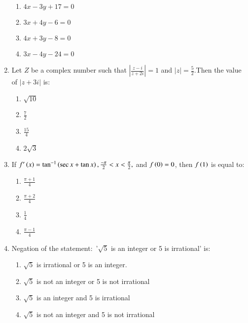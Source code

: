 \documentclass[journal,12pt,twocolumn]{IEEEtran}
\theoremstyle{remark}
\begin{document}
\begin{enumerate}
\begin{enumerate}
    \item $4x-3y+17=0$
    \item $3x+4y-6=0$
    \item $4x+3y-8=0$
    \item $3x-4y-24=0$
\end{enumerate}
\item Let $Z$ be a complex number such that $\left\lvert\frac{z-i}{z+2i}\right\rvert=1$ and $\lvert z \rvert=\frac{5}{2}$.Then the value of $\lvert z+3i\rvert$ is$\colon$
\begin{enumerate}
    \item $\sqrt{10}$
    \item $\frac{7}{2}$
    \item $\frac{15}{4}$
    \item $2\sqrt{3}$
\end{enumerate}
\item If $f^{\prime}\left(x\right)=\tan^{-1}\left(\sec x + \tan x\right),\frac{-\pi}{2}<x<\frac{\pi}{2},$ and $f\left(0\right)=0$, then $f\left(1\right)$ is equal to$\colon$
\begin{enumerate}
    \item $\frac{\pi+1}{4}$
    \item $\frac{\pi+2}{4}$
    \item $\frac{1}{4}$
    \item $\frac{\pi-1}{4}$
\end{enumerate}
\item Negation of the statement$\colon$ '$\sqrt{5}$ is an integer or 5 is irrational' is$\colon$
\begin{enumerate}
    \item $\sqrt{5}$ is irrational or 5 is an integer.
    \item $\sqrt{5}$ is not an integer or 5 is not irrational
    \item $\sqrt{5}$ is an integer and 5 is irrational
    \item $\sqrt{5}$ is not an integer and 5 is not irrational
\end{enumerate}
    
\end{enumerate}
 
\end{document}
